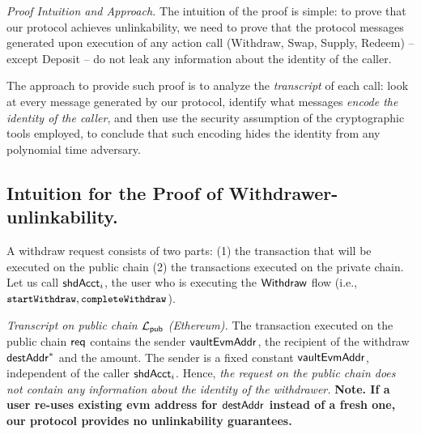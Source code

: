 \vspace{8pt}
\noindent
\emph{Proof Intuition and Approach.}
The intuition of the proof is simple: to prove that our protocol achieves unlinkability, we need to prove that  the protocol messages generated upon execution of any action call (Withdraw, Swap, Supply, Redeem) -- except Deposit --   do not leak any information about the identity of the caller.

The approach to provide such proof is to analyze the \emph{transcript} of each call: look at every message generated by our protocol,  identify what  messages \emph{encode the identity of the caller}, and then use the security assumption of the cryptographic tools employed, to conclude that such encoding hides the identity from any polynomial time adversary.


\subsection{Intuition for the Proof of  Withdrawer-unlinkability.}
A withdraw request consists of two parts: (1) the transaction that will be executed on the public chain (2) the transactions executed on the private chain. Let us call $\mathsf{shdAcct}_i$, the user who is executing the $\mathsf{Withdraw}$  flow (i.e., $\texttt{\small startWithdraw},\texttt{\small completeWithdraw}$).

\vspace{5pt}
\emph{Transcript on public chain $\mathcal{L}_{\mathsf{pub}}$ (Ethereum).}
The transaction executed  on the public chain $\mathsf{req}$ contains the sender $\mathsf{vaultEvmAddr}$, the recipient of the withdraw $\mathsf{destAddr}^*$ and the amount. The sender is a fixed constant $\mathsf{vaultEvmAddr}$, independent of the caller $\mathsf{shdAcct}_i$.
Hence, \emph{the request on the public chain does not contain any information about the identity of the withdrawer.}
\textbf{Note. If a user re-uses  existing  evm address for $\mathsf{destAddr}$ instead of a fresh one, our protocol provides no unlinkability guarantees.}


